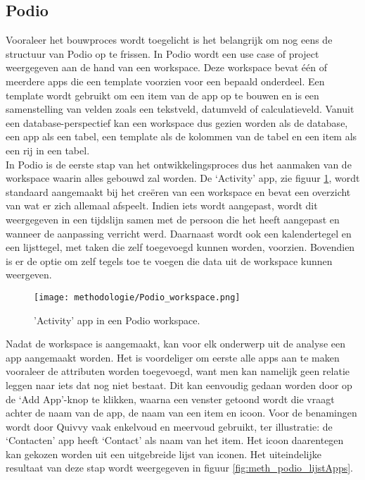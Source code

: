 \subsection{Podio} %

Vooraleer het bouwproces wordt toegelicht is het belangrijk om nog eens de structuur van Podio op te frissen. In Podio wordt een use case of project weergegeven aan de hand van een workspace. Deze workspace bevat één of meerdere apps die een template voorzien voor een bepaald onderdeel. Een template wordt gebruikt om een item van de app op te bouwen en is een samenstelling van velden zoals een tekstveld, datumveld of calculatieveld. Vanuit een database-perspectief kan een workspace dus gezien worden als de database, een app als een tabel, een template als de kolommen van de tabel en een item als een rij in een tabel. \\

In Podio is de eerste stap van het ontwikkelingsproces dus het aanmaken van de workspace waarin alles gebouwd zal worden. De ‘Activity’ app, zie figuur \ref{fig:meth_podio_workspace}, wordt standaard aangemaakt bij het creëren van een workspace en bevat een overzicht van wat er zich allemaal afspeelt. Indien iets wordt aangepast, wordt dit weergegeven in een tijdslijn samen met de persoon die het heeft aangepast en wanneer de aanpassing verricht werd. Daarnaast wordt ook een kalendertegel en een lijsttegel, met taken die zelf toegevoegd kunnen worden, voorzien. Bovendien is er de optie om zelf tegels toe te voegen die data uit de workspace kunnen weergeven. \\

\begin{figure}[h]
    \centering
    \texttt{[image: methodologie/Podio\_workspace.png]}
    \caption{'Activity' app in een Podio workspace.}
    \label{fig:meth_podio_workspace}
\end{figure}

Nadat de workspace is aangemaakt, kan voor elk onderwerp uit de analyse een app aangemaakt worden. Het is voordeliger om eerste alle apps aan te maken vooraleer de attributen worden toegevoegd, want men kan namelijk geen relatie leggen naar iets dat nog niet bestaat. Dit kan eenvoudig gedaan worden door op de ‘Add App’-knop te klikken, waarna een venster getoond wordt die vraagt achter de naam van de app, de naam van een item en icoon. Voor de benamingen wordt door Quivvy vaak enkelvoud en meervoud gebruikt, ter illustratie: de ‘Contacten’ app heeft ‘Contact’ als naam van het item. Het icoon daarentegen kan gekozen worden uit een uitgebreide lijst van iconen. Het uiteindelijke resultaat van deze stap wordt weergegeven in figuur \ref{fig:meth_podio_lijstApps}. \\

